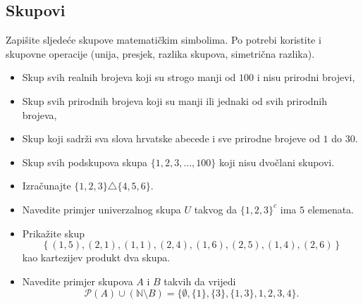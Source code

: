 \subsection*{Skupovi}
\begin{exercise}{\unskip} Zapišite sljedeće skupove matematičkim simbolima. Po potrebi koristite i skupovne operacije (unija, presjek, razlika skupova, simetrična razlika).
\begin{itemize}
\item[a)] Skup svih realnih brojeva koji su strogo manji od \(100\) i nisu prirodni brojevi,
\item[b)] Skup svih prirodnih brojeva koji su manji ili jednaki od svih prirodnih brojeva,
\item[c)] Skup koji sadrži sva slova hrvatske abecede i sve prirodne brojeve od \(1\) do \(30\).
\item[d)] Skup svih podskupova skupa \(\{1, 2, 3, \dots, 100\}\) koji nisu dvočlani skupovi.
\end{itemize}
\end{exercise}
\begin{exercise}{\unskip} \textbf{}
\begin{itemize}
\item[a)] Izračunajte \(\{1, 2, 3\}\triangle\{4, 5, 6\}\).
\item[b)] Navedite primjer univerzalnog skupa \(U\) takvog da \(\{1, 2, 3\}^c\) ima \(5\) elemenata.
\item[c)] Prikažite skup
\[\left\{(1, 5), (2, 1), (1, 1), (2, 4), (1, 6), (2, 5), (1, 4), (2, 6)\right\}\]
kao kartezijev produkt dva skupa.
\item[d)] Navedite primjer skupova \(A\) i \(B\) takvih da vrijedi \[\mathcal{P}(A)\cup \left(\mathbb{N}\setminus B\right)=\{\emptyset, \{1\}, \{3\}, \{1, 3\}, 1, 2,3, 4\}.\]
\end{itemize}
\end{exercise}
